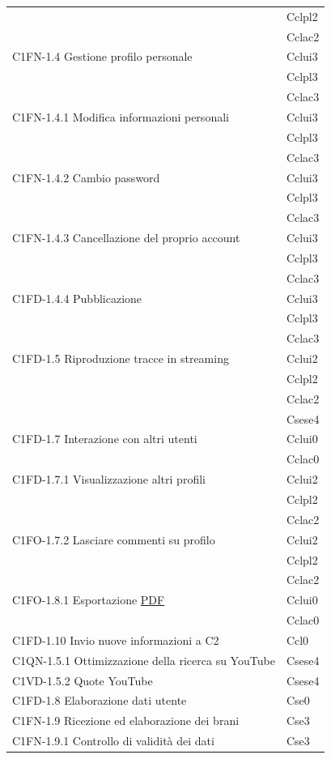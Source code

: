 \begin{footnotesize}
\begin{longtable}[!h]{|l|l|}
 & Cclpl2\\
 & Cclac2\\\hline 
C1FN-1.4 Gestione profilo personale & Cclui3\\
 & Cclpl3\\
 & Cclac3\\\hline 
C1FN-1.4.1 Modifica informazioni personali & Cclui3\\
 & Cclpl3\\
 & Cclac3\\\hline 
C1FN-1.4.2 Cambio password & Cclui3\\
 & Cclpl3\\
 & Cclac3\\\hline 
C1FN-1.4.3 Cancellazione del proprio account & Cclui3\\
 & Cclpl3\\
 & Cclac3\\\hline 
C1FD-1.4.4 Pubblicazione & Cclui3\\
 & Cclpl3\\
 & Cclac3\\\hline 
C1FD-1.5 Riproduzione tracce in streaming & Cclui2\\
 & Cclpl2\\
 & Cclac2\\
 & Csese4\\\hline 
C1FD-1.7 Interazione con altri utenti & Cclui0\\
 & Cclac0\\\hline 
C1FD-1.7.1 Visualizzazione altri profili & Cclui2\\
 & Cclpl2\\
 & Cclac2\\\hline
C1FO-1.7.2 Lasciare commenti su profilo & Cclui2\\
 & Cclpl2\\
 & Cclac2\\\hline
C1FO-1.8.1 Esportazione \underline{PDF} & Cclui0\\
 & Cclac0\\\hline
C1FD-1.10 Invio nuove informazioni a C2 & Ccl0\\\hline
C1QN-1.5.1 Ottimizzazione della ricerca su YouTube & Csese4 \\ \hline
C1VD-1.5.2 Quote YouTube & Csese4\\ \hline
C1FD-1.8 Elaborazione dati utente & Cse0\\ \hline
C1FN-1.9 Ricezione ed elaborazione dei brani & Cse3\\ \hline
C1FN-1.9.1 Controllo di validit\`a dei dati & Cse3\\ \hline

\end{longtable}
\end{footnotesize}
